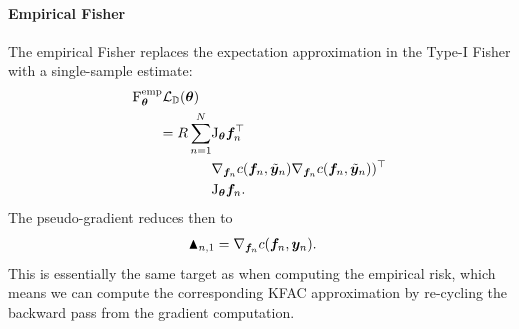 \paragraph{Empirical Fisher}
The empirical Fisher replaces the expectation approximation in the Type-I Fisher with a single-sample estimate:
\begin{align*}
  \mathrm{F}_{\bm{\theta}}^{\text{emp}} &{\mathcal{L}}_{{\mathbb{D}}}({\bm{\theta}}) \\
  &\begin{aligned}= R \sum_{n=1}^N
      &\mathrm{J}_{{\bm{\theta}}} {\bm{f}}_n^{\top} \\
      & \nabla_{{\bm{f}}_n} c({\bm{f}}_n, \tilde{{\bm{y}}}_{n}) \nabla_{{\bm{f}}_n} c({\bm{f}}_n, \tilde{{\bm{y}}}_n ))^{\top} \\
      &\mathrm{J}_{{\bm{\theta}}} {\bm{f}}_n.
  \end{aligned}
\end{align*}
The pseudo-gradient reduces then to
\begin{align*}
  \blacktriangle_{n,1}
  &= \nabla_{{\bm{f}}_n}  c({\bm{f}}_n, {\bm{y}}_n).
\end{align*}
This is essentially the same target as when computing the empirical risk, which means we can compute the corresponding KFAC approximation by re-cycling the backward pass from the gradient computation.


